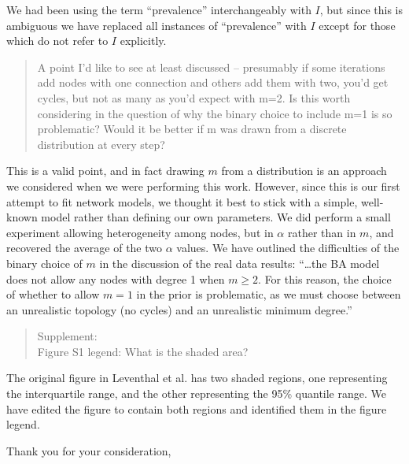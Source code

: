 \documentclass[12pt]{letter}
\begin{document}
\begin{letter}{ }
We had been using the term ``prevalence'' interchangeably with $I$, but since
this is ambiguous we have replaced all instances of ``prevalence'' with $I$
except for those which do not refer to $I$ explicitly.

\begin{quote}
  \itshape

  A point I'd like to see at least discussed -- presumably if some iterations
  add nodes with one connection and others add them with two, you'd get cycles,
  but not as many as you'd expect with m=2. Is this worth considering in the
  question of why the binary choice to include m=1 is so problematic? Would it
  be better if m was drawn from a discrete distribution at every step?
\end{quote}

This is a valid point, and in fact drawing $m$ from a distribution is an
approach we considered when we were performing this work. However, since this
is our first attempt to fit network models, we thought it best to stick with
a simple, well-known model rather than defining our own parameters. We did
perform a small experiment allowing heterogeneity among nodes, but in $\alpha$
rather than in $m$, and recovered the average of the two $\alpha$ values. We
have outlined the difficulties of the binary choice of $m$ in the discussion of
the real data results: ``\ldots the BA model does not allow any nodes with
degree 1 when $m \geq 2$. For this reason, the choice of whether to allow $m =
1$ in the prior is problematic, as we must choose between an unrealistic
topology (no cycles) and an unrealistic minimum degree.''

\begin{quote}
  \itshape

  Supplement: \\
  Figure S1 legend: What is the shaded area?
\end{quote}

The original figure in Leventhal et al. has two shaded regions, one
representing the interquartile range, and the other representing the 95\%
quantile range. We have edited the figure to contain both regions and
identified them in the figure legend.

\closing{Thank you for your consideration,}
\end{letter}
\end{document}
